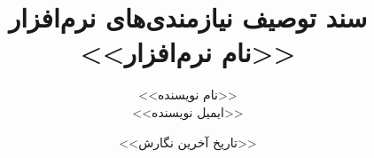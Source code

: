 \documentclass[12pt,fleqn,oneside]{book}
\begin{document}
\title{سند توصیف نیازمندی‌های نرم‌افزار \\ 
<<نام نرم‌افزار>>
}

\author{<<نام نویسنده>> \\
 <<ایمیل نویسنده>>
 }

\date{<<تاریخ آخرین نگارش>>}
\maketitle
\pagestyle{plain}
\clearpage
\tableofcontents
\clearpage
\listoffigures
\clearpage
{}









\end{document}
